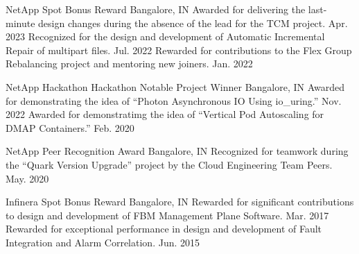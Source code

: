 




\begin{cventries}

  \honorentry
    {NetApp} %
    {Spot Bonus Reward} %
    {Bangalore, IN}
    {
	\honorsubentry
	  {Awarded for delivering the last-minute design changes during the absence of the lead for the TCM project.}
	  {Apr. 2023}
	\honorsubentry
	  {Recognized for the design and development of Automatic Incremental Repair of multipart files.}
	  {Jul. 2022}
	\honorsubentry
	  {Rewarded for contributions to the Flex Group Rebalancing project and mentoring new joiners.}
	  {Jan. 2022}
    }

  \honorentry
    {NetApp Hackathon} %
    {Hackathon Notable Project Winner} %
    {Bangalore, IN}
    {
	\honorsubentry
	  {Awarded for demonstrating the idea of ``Photon Asynchronous IO Using io\_uring.''}
	  {Nov. 2022} %
	\honorsubentry
	  {Awarded for demonstratimg the idea of ``Vertical Pod Autoscaling for DMAP Containers.''}
	  {Feb. 2020} %
    }

  \honorentry
    {NetApp} %
    {Peer Recognition Award} %
    {Bangalore, IN}
    {
	\honorsubentry
	  {Recognized for teamwork during the ``Quark Version Upgrade'' project by the Cloud Engineering Team Peers.} %
	  {May. 2020} %
    }

  \honorentry
    {Infinera} %
    {Spot Bonus Reward} %
    {Bangalore, IN}
    {
	\honorsubentry
	  {Rewarded for significant contributions to design and development of FBM Management Plane Software.}
	  {Mar. 2017} %
	\honorsubentry
	  {Rewarded for exceptional performance in design and development of Fault Integration and Alarm Correlation.} %
	  {Jun. 2015} %
    }


\end{cventries}
